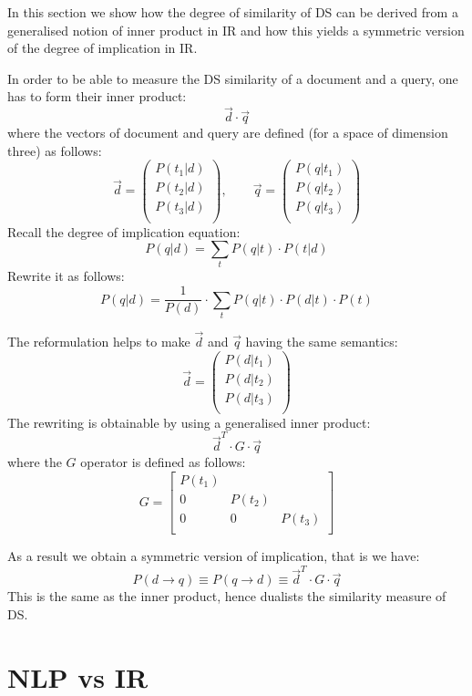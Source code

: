 In this section we show how the degree of similarity of DS can be derived from a generalised notion of inner product in IR and how this yields a symmetric version of the degree of implication in IR. 
 
In order to be able to measure the DS similarity of a document and a query, one has to form their inner product:
\[
\vec{d} \cdot \vec{q}
\]
where the vectors of document and query are defined (for a space of dimension three) as follows:
\[
\vec{d} =
	\left(
	\begin{matrix}
	P(t_1|d)\\
	P(t_2|d)\\
	P(t_3|d)\\
	\end{matrix}
	\right),
\qquad
\vec{q} =
	\left(
	\begin{matrix}
	P(q|t_1)\\
	P(q|t_2)\\
	P(q|t_3)\\
	\end{matrix}
	\right)
\]
Recall the degree of implication equation:
\[
P(q|d) = \sum_t P(q|t) \cdot P(t|d)
\]
Rewrite it as follows:
\[
P(q|d) = \frac{1}{P(d)} \cdot \sum_t P(q|t) \cdot P(d|t) \cdot P(t)
\]

The reformulation helps
to make $\vec{d}$ and $\vec{q}$ having the same semantics:
\[
\vec{d} =
	\left(
	\begin{matrix}
	P(d|t_1)\\
	P(d|t_2)\\
	P(d|t_3)\\
	\end{matrix}
	\right)
\]
The rewriting is obtainable by using a generalised inner product:
\[
\vec{d}^T \cdot G \cdot \vec{q}
\]
where the  $G$ operator is defined as follows:
\[
G=
\left[
\begin{matrix}
P(t_1) \\
0 & P(t_2) \\
0 & 0 & P(t_3) \\
\end{matrix}
\right]
\]


As a result  we obtain a symmetric version of implication, that is we have:
\[
P(d \to q) \equiv P(q \to d) \equiv \vec{d}^T \cdot G \cdot \vec{q}
\] 
This is the same as the inner product, hence dualists the similarity measure of DS. 

\section{NLP vs IR}

